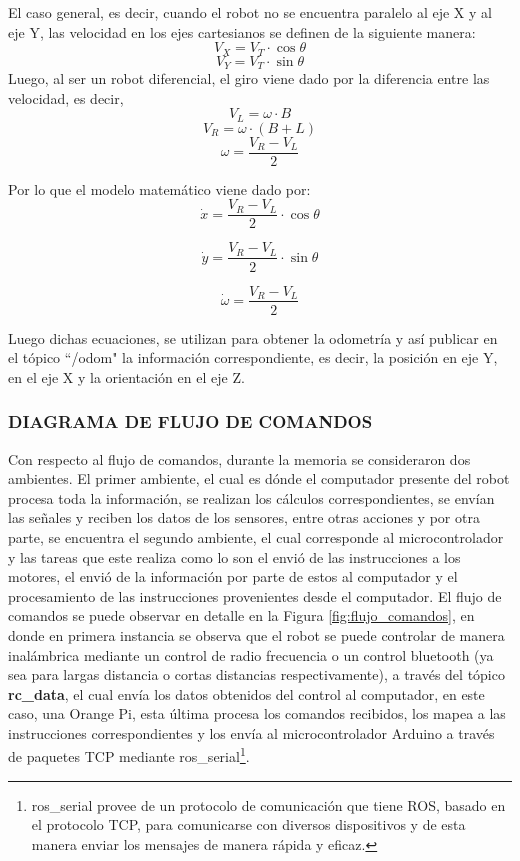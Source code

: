 El caso general, es decir, cuando el robot no se encuentra paralelo al eje X y al eje Y, las velocidad en  los ejes cartesianos se definen de la siguiente manera:
\[
V_X = V_T \cdot \cos{\theta}
\]
\[
V_Y = V_T \cdot \sin{\theta}
\]
Luego, al ser un robot diferencial, el giro viene dado por la diferencia entre las velocidad, es decir,
\[
V_L = \omega \cdot B
\]
\[
V_R = \omega \cdot (B + L)
\]
\[
\omega = \frac{V_R - V_L}{2}
\]

Por lo que el modelo matemático viene dado por:
\begin{equation}
    \dot{x} = \frac{V_R - V_L}{2} \cdot \cos{\theta}
    \label{ecuacion_1}
\end{equation}

\begin{equation}
    \dot{y} = \frac{V_R - V_L}{2} \cdot \sin{\theta}
    \label{ecuacion_2}
\end{equation}

\begin{equation}
    \dot{\omega} = \frac{V_R - V_L}{2}
    \label{ecuacion_3}
\end{equation}

Luego dichas ecuaciones, se utilizan para obtener la odometría y así publicar en el tópico ``/odom" la información correspondiente, es decir, la posición en eje Y, en el eje X y la orientación en el eje Z.



\subsubsection{DIAGRAMA DE FLUJO DE COMANDOS}
Con respecto al flujo de comandos, durante la memoria se consideraron dos ambientes. El primer ambiente, el cual es dónde el computador presente del robot procesa toda la información, se realizan los cálculos correspondientes, se envían las señales y reciben los datos de los sensores, entre otras acciones y por otra parte, se encuentra el segundo ambiente, el cual corresponde al microcontrolador y las tareas que este realiza como lo son el envió de las instrucciones a los motores, el envió de la información por parte de estos al computador y el procesamiento de las instrucciones provenientes desde el computador. 
El flujo de comandos se puede observar en detalle en la Figura \ref{fig:flujo_comandos}, en donde en primera instancia se observa que el robot se puede controlar de manera inalámbrica mediante un control de radio frecuencia o un control bluetooth (ya sea para largas distancia o cortas distancias respectivamente), a través del tópico \textbf{rc\_data}, el cual envía los datos obtenidos del control al computador, en este caso, una Orange Pi, esta última procesa los comandos recibidos, los mapea a las instrucciones correspondientes y los envía al microcontrolador Arduino a través de paquetes TCP mediante ros\_serial\footnote{ros\_serial provee de un protocolo de comunicación que tiene ROS, basado en el protocolo TCP, para comunicarse con diversos dispositivos y de esta manera enviar los mensajes de manera rápida y eficaz.}.

